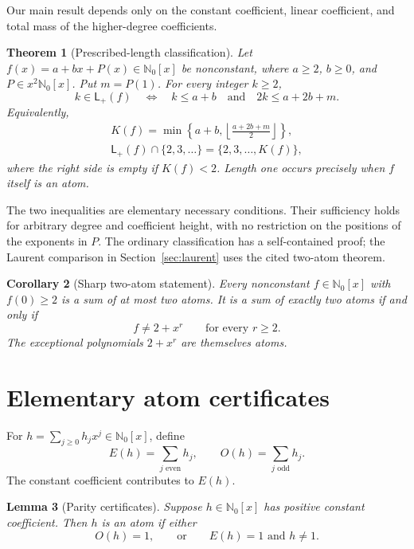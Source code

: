 \documentclass[11pt]{amsart}
\newcommand{\Nzero}{\mathbb N_0}
\newcommand{\Lplus}{\mathsf L_{+}}
\newtheorem{theorem}{Theorem}[section]
\newtheorem{lemma}[theorem]{Lemma}
\newtheorem{corollary}[theorem]{Corollary}
\theoremstyle{definition}
\theoremstyle{remark}
\begin{document}
Our main result depends only on the constant coefficient, linear
coefficient, and total mass of the higher-degree coefficients.

\begin{theorem}[Prescribed-length classification]\label{thm:main}
Let $f(x)=a+bx+P(x)\in\Nzero[x]$ be nonconstant, where
$a\ge2$, $b\ge0$, and $P\in x^2\Nzero[x]$. Put $m=P(1)$.
For every integer $k\ge2$,
\begin{equation}\label{eq:capacity}
k\in\Lplus(f)
\quad\Longleftrightarrow\quad
k\le a+b\quad\text{and}\quad 2k\le a+2b+m.
\end{equation}
Equivalently,
\begin{equation}\label{eq:interval}
\begin{gathered}
K(f)=\min\left\{a+b,\left\lfloor\frac{a+2b+m}{2}\right\rfloor\right\},\\
\Lplus(f)\cap\{2,3,\ldots\}=\{2,3,\ldots,K(f)\},
\end{gathered}
\end{equation}
where the right side is empty if $K(f)<2$. Length one occurs precisely
when $f$ itself is an atom.
\end{theorem}

The two inequalities are elementary necessary conditions. Their
sufficiency holds for arbitrary degree and coefficient height, with no
restriction on the positions of the exponents in $P$. The ordinary
classification has a self-contained proof; the Laurent comparison in
Section~\ref{sec:laurent} uses the cited two-atom theorem.

\begin{corollary}[Sharp two-atom statement]\label{cor:two}
Every nonconstant $f\in\Nzero[x]$ with $f(0)\ge2$ is a sum of at most two
atoms. It is a sum of exactly two atoms if and only if
\[
f\ne2+x^r\qquad\text{for every }r\ge2.
\]
The exceptional polynomials $2+x^r$ are themselves atoms.
\end{corollary}

\section{Elementary atom certificates}

For $h=\sum_{j\ge0}h_jx^j\in\Nzero[x]$, define
\[
E(h)=\sum_{j\text{ even}}h_j,\qquad
O(h)=\sum_{j\text{ odd}}h_j.
\]
The constant coefficient contributes to $E(h)$.

\begin{lemma}[Parity certificates]\label{lem:parity}
Suppose $h\in\Nzero[x]$ has positive constant coefficient. Then $h$ is
an atom if either
\[
O(h)=1,\qquad\text{or}\qquad E(h)=1\text{ and }h\ne1.
\]
\end{lemma}
\end{document}
